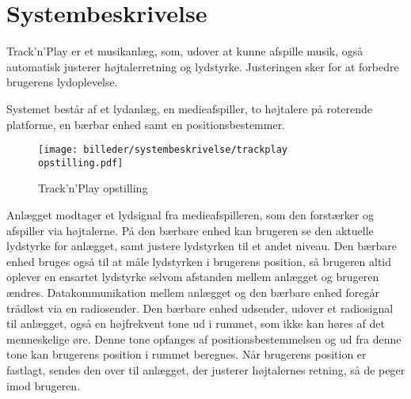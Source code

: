 \chapter{Systembeskrivelse}
\label{chap:systembeskrivelse}

Track’n’Play er et musikanlæg, som, udover at kunne afspille musik, også automatisk justerer højtalerretning og lydstyrke. Justeringen sker for at forbedre brugerens lydoplevelse.

Systemet består af et lydanlæg, en medieafspiller, to højtalere på roterende platforme, en bærbar enhed samt en positionsbestemmer. 

\begin{figure}[h!]
  \centering
    \texttt{[image: billeder/systembeskrivelse/trackplay opstilling.pdf]}
    \caption{Track'n'Play opstilling}
\end{figure}


Anlægget modtager et lydsignal fra medieafspilleren, som den forstærker og afspiller via højtalerne.\newline
På den bærbare enhed kan brugeren se den aktuelle lydstyrke for anlægget, samt justere lydstyrken til et andet niveau. Den bærbare enhed bruges også til at måle lydstyrken i brugerens position, så brugeren altid oplever en ensartet lydstyrke selvom afstanden mellem anlægget og brugeren ændres. Datakommunikation mellem anlægget og den bærbare enhed foregår trådløst via en radiosender.\newline
Den bærbare enhed udsender, udover et radiosignal til anlægget, også en højfrekvent tone ud i rummet, som ikke kan høres af det menneskelige øre. Denne tone opfanges af positionsbestemmelsen og ud fra denne tone kan brugerens position i rummet beregnes.\newline
Når brugerens position er fastlagt, sendes den over til anlægget, der justerer højtalernes retning, så de peger imod brugeren. 